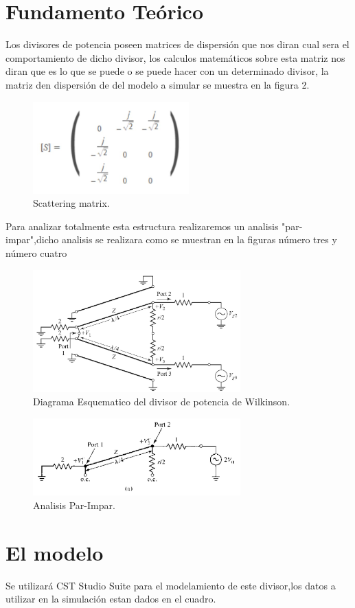 \documentclass[a4paper]{IEEEtran} %
\begin{document}
\section{Fundamento Teórico}
Los divisores de potencia poseen matrices de dispersión que nos diran cual sera el comportamiento de dicho divisor, los calculos matemáticos sobre esta matriz nos diran que es lo que se puede o se puede hacer con un determinado divisor, la matriz den dispersión de del modelo a simular se muestra en la figura 2.\\
\begin{figure}[h]
    \centering
        \includegraphics[width=6cm]{imagenes/img1}
        \caption{Scattering matrix.}
        \label{fig.}
\end{figure}
Para analizar totalmente esta estructura realizaremos un analisis "par-impar",dicho analisis se realizara como se muestran en la figuras número tres y número cuatro 
\begin{figure}[h]
    \centering
        \includegraphics[width=8cm]{imagenes/img3}
        \caption{Diagrama Esquematico del divisor de potencia de Wilkinson.}
        \label{fig.}
\end{figure}
\begin{figure}[h]
    \centering
        \includegraphics[width=8cm]{imagenes/img4}
        \caption{Analisis Par-Impar.}
        \label{fig.}
\end{figure}
\section{El modelo}
Se utilizará CST Studio Suite para el modelamiento de este divisor,los datos a utilizar en la simulación estan dados en el cuadro.



\end{document}
